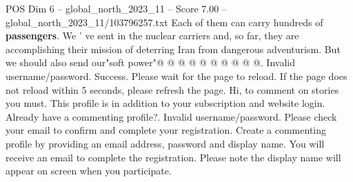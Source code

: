 \begin{textsample}{POS Dim 6 – global\_north\_2023\_11 – Score 7.00 – global\_north\_2023\_11/103796257.txt}
Each of them can carry hundreds of \textbf{passengers}.
We ' ve sent in the nuclear carriers and, so far, they are accomplishing their mission of deterring Iran from dangerous adventurism.
But we should also send our"soft power"@ @ @ @ @ @ @ @ @ @.
Invalid username/password.
Success.
Please wait for the page to reload.
If the page does not reload within 5 seconds, please refresh the page.
Hi, to comment on stories you must.
This profile is in addition to your subscription and website login.
Already have a commenting profile?.
Invalid username/password.
Please check your email to confirm and complete your registration.
Create a commenting profile by providing an email address, password and display name.
You will receive an email to complete the registration.
Please note the display name will appear on screen when you participate.

\end{textsample}
